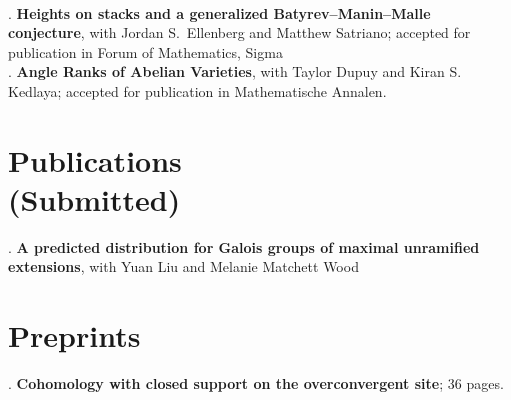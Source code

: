 \documentclass[margin,line]{res}
\newcounter{pubs}
\begin{document}
\begin{resume}
\vspace{.08cm}\\
 .  \textbf{Heights on stacks and a generalized Batyrev--Manin--Malle conjecture}, with Jordan S.~Ellenberg and Matthew Satriano; accepted for publication in Forum of Mathematics, Sigma
\vspace{.08cm}\\
 .  \textbf{Angle Ranks of Abelian Varieties}, with Taylor Dupuy and Kiran S. Kedlaya; accepted for publication in Mathematische Annalen. 



\vspace{-7pt}
\section{\sc Publications \\ {(Submitted)}}



 .  \textbf{A predicted distribution for Galois groups of maximal unramified extensions}, with Yuan Liu and Melanie Matchett Wood



\section{\sc Preprints}
 .  \textbf{Cohomology with closed support on the overconvergent site}; 36 pages. \vspace{.48cm}\\

\vspace{-7pt}

\end{resume}
\end{document}
